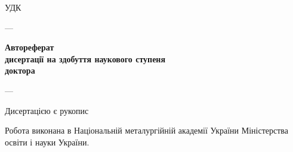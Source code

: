 \documentclass[a4paper,13pt]{atuaref}
\author{\dissauthorFullAref}
\title{\booknameUa}
\date{\bookyear}
\begin{document}
\sloppy

\thispagestyle{empty}
\begin{center}

\textbf{\belongAref}

\vspace{1ex}

\textbf{\institutionAref}

\vspace{3ex}

\textbf{\dissauthorFullAref}

\end{center}

\vspace{3ex}

\begin{flushright}
УДК \UDC
\end{flushright}

\vfill

\begin{center}
\textbf{\Large
\booknameUa
}

\vfill

\dissSpecId --- \dissSpecAref

\vfill

\textbf{Автореферат} \\
\textbf{дисертації на здобуття наукового ступеня }\\
\textbf{доктора \dissScopeAref }


\vfill

\cityAref --- \bookyear

\end{center}

\clearpage

\thispagestyle{empty}

\noindent
Дисертацією є рукопис

\vspace{3ex plus 2ex}

\noindent
Робота виконана в Національній металургійній академії України
Міністерства освіти і науки України.


\vspace{4ex plus 4ex}
\end{document}
